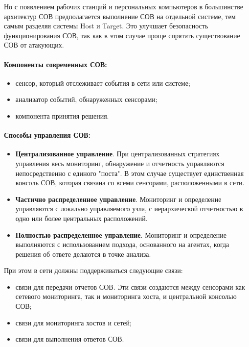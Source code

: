Но с появлением рабочих станций и персональных компьютеров в большинстве архитектур
СОВ предполагается выполнение СОВ на отдельной системе, тем самым разделяя системы
Host и Target. Это улучшает безопасность функционирования СОВ, так как в этом случае
проще спрятать существование СОВ от атакующих.


\paragraph*{Компоненты современных СОВ:}

\begin{itemize}
	\item сенсор, который отслеживает события в сети или системе;

	\item анализатор событий, обнаруженных сенсорами;

	\item компонента принятия решения.
\end{itemize}


\paragraph*{Способы управления СОВ:}

\begin{itemize}
	\item \textbf{Централизованное управление}. При централизованных стратегиях управления
	весь мониторинг, обнаружение и отчетность управляются непосредственно с единого "поста".
	В этом случае существует единственная консоль СОВ, которая связана со всеми сенсорами,
	расположенными в сети.

	\item \textbf{Частично распределенное управление}. Мониторинг и определение управляются
	с локально управляемого узла, с иерархической отчетностью в одно или более центральных
	расположений.

	\item \textbf{Полностью распределенное управление}. Мониторинг и определение выполняются
	с использованием подхода, основанного на агентах, когда решения об ответе делаются в
	точке анализа.
\end{itemize}

При этом в сети должны поддерживаться следующие связи:

\begin{itemize}
	\item связи для передачи отчетов СОВ. Эти связи создаются между сенсорами как сетевого
	мониторинга, так и мониторинга хоста, и центральной консолью СОВ;

	\item связи для мониторинга хостов и сетей;

	\item связи для выполнения ответов СОВ.
\end{itemize}

